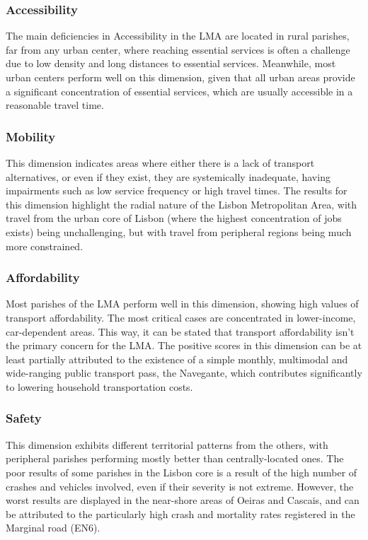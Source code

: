 \documentclass[
  authoryear,
  review,
  1p]{elsarticle}
\begin{document}
\subsubsection{Accessibility}\label{accessibility}

The main deficiencies in Accessibility in the LMA are located in rural
parishes, far from any urban center, where reaching essential services
is often a challenge due to low density and long distances to essential
services. Meanwhile, most urban centers perform well on this dimension,
given that all urban areas provide a significant concentration of
essential services, which are usually accessible in a reasonable travel
time.

\subsubsection{Mobility}\label{mobility}

This dimension indicates areas where either there is a lack of transport
alternatives, or even if they exist, they are systemically inadequate,
having impairments such as low service frequency or high travel times.
The results for this dimension highlight the radial nature of the Lisbon
Metropolitan Area, with travel from the urban core of Lisbon (where the
highest concentration of jobs exists) being unchallenging, but with
travel from peripheral regions being much more constrained.

\subsubsection{Affordability}\label{affordability}

Most parishes of the LMA perform well in this dimension, showing high
values of transport affordability. The most critical cases are
concentrated in lower-income, car-dependent areas. This way, it can be
stated that transport affordability isn't the primary concern for the
LMA. The positive scores in this dimension can be at least partially
attributed to the existence of a simple monthly, multimodal and
wide-ranging public transport pass, the Navegante, which contributes
significantly to lowering household transportation costs.

\subsubsection{Safety}\label{safety}

This dimension exhibits different territorial patterns from the others,
with peripheral parishes performing mostly better than centrally-located
ones. The poor results of some parishes in the Lisbon core is a result
of the high number of crashes and vehicles involved, even if their
severity is not extreme. However, the worst results are displayed in the
near-shore areas of Oeiras and Cascais, and can be attributed to the
particularly high crash and mortality rates registered in the Marginal
road (EN6).
\end{document}
